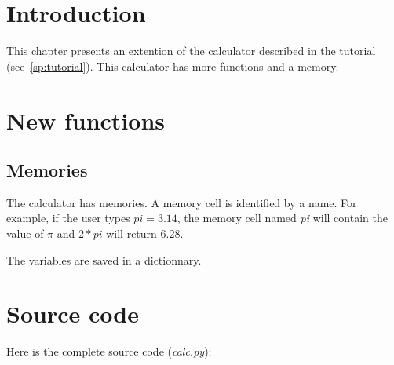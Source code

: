 %
%
%

\section{Introduction}

This chapter presents an extention of the calculator described in the tutorial (see~\ref{sp:tutorial}).
This calculator has more functions and a memory.

\section{New functions}

\subsection{Memories}

The calculator has memories.
A memory cell is identified by a name.
For example, if the user types \emph{$pi = 3.14$}, the memory cell named \emph{pi} will contain the value of \emph{$\pi$} and \emph{$2*pi$} will return \emph{$6.28$}.

The variables are saved in a dictionnary.

\section{Source code}

Here is the complete source code (\emph{calc.py}):


